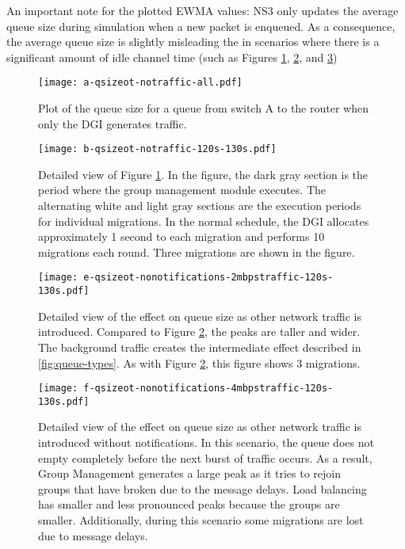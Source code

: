 An important note for the plotted \ac{EWMA} values: \ac{NS3} only updates the average queue size during simulation when a new packet is enqueued.
As a consequence, the average queue size is slightly misleading the in scenarios where there is a significant amount of idle channel time (such as Figures \ref{fig:plota}, \ref{fig:plotb}, and \ref{fig:plote})

\begin{figure}
\centering
\texttt{[image: a-qsizeot-notraffic-all.pdf]}
\caption{Plot of the queue size for a queue from switch A to the router when only the DGI generates traffic.}
\label{fig:plota}
\end{figure}

\begin{figure}
\centering
\texttt{[image: b-qsizeot-notraffic-120s-130s.pdf]}
\caption[Detailed view of Figure \ref{fig:plota}.]{
Detailed view of Figure \ref{fig:plota}. In the figure, the dark gray section is the period where the group management module executes.
The alternating white and light gray sections are the execution periods for individual migrations.
In the normal schedule, the DGI allocates approximately 1 second to each migration and performs 10 migrations each round.
Three migrations are shown in the figure.}
\label{fig:plotb}
\end{figure}

\begin{figure}
\centering
\texttt{[image: e-qsizeot-nonotifications-2mbpstraffic-120s-130s.pdf]}
\caption[Detailed view of the effect on queue size as other network traffic is introduced.]{
Detailed view of the effect on queue size as other network traffic is introduced.
Compared to Figure \ref{fig:plotb}, the peaks are taller and wider. 
The background traffic creates the intermediate effect described in \ref{fig:queue-types}.
As with Figure \ref{fig:plotb}, this figure shows 3 migrations.}
\label{fig:plote}
\end{figure}

\begin{figure}
\centering
\texttt{[image: f-qsizeot-nonotifications-4mbpstraffic-120s-130s.pdf]}
\caption[Detailed view of the effect on queue size as other network traffic is introduced without notifications.]{
Detailed view of the effect on queue size as other network traffic is introduced without notifications.
In this scenario, the queue does not empty completely before the next burst of traffic occurs.
As a result, Group Management generates a large peak as it tries to rejoin groups that have broken due to the message delays.
Load balancing has smaller and less pronounced peaks because the groups are smaller.
Additionally, during this scenario some migrations are lost due to message delays.}
\label{fig:plotf}
\end{figure}

